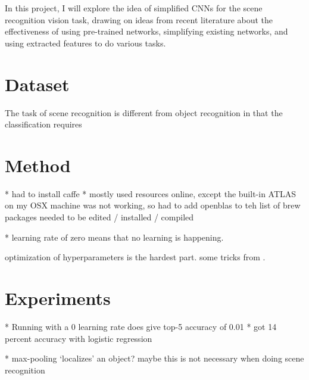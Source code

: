 \documentclass[10pt]{article}
\begin{document}
In this project, I will explore the idea of simplified CNNs for the scene recognition vision task, drawing on ideas from recent literature about the effectiveness of using pre-trained networks, simplifying existing networks, and using extracted features to do various tasks. 

\section{Dataset}

The task of scene recognition is different from object recognition in that the classification requires 




\section{Method}

* had to install caffe
* mostly used resources online, except the built-in ATLAS on my OSX machine was not working, so had to add openblas to teh list of brew packages needed to be edited / installed / compiled

* learning rate of zero means that no learning is happening. 

optimization of hyperparameters is the hardest part. some tricks from \cite{bottou_large-scale_2010}.

\section{Experiments}

* Running with a 0 learning rate does give top-5 accuracy of 0.01
* got 14 percent accuracy with logistic regression

* max-pooling `localizes' an object? maybe this is not necessary when doing scene recognition



\end{document}
